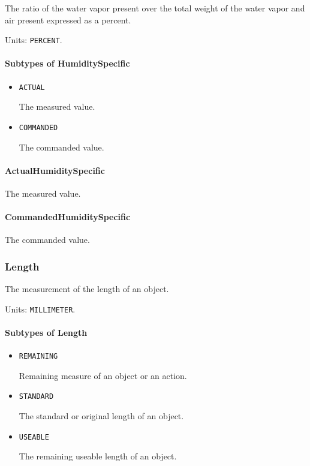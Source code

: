 The ratio of the water vapor present over the total weight of the water vapor and air present expressed as a percent.



Units: \texttt{PERCENT}.

\paragraph{Subtypes of HumiditySpecific}\mbox{}
\label{sec:Subtypes of HumiditySpecific}

\begin{itemize}

\item \texttt{ACTUAL}


The measured value.

\item \texttt{COMMANDED}


The commanded value.


\end{itemize}

\paragraph{ActualHumiditySpecific}\mbox{}
\label{sec:ActualHumiditySpecific}


The measured value.


\paragraph{CommandedHumiditySpecific}\mbox{}
\label{sec:CommandedHumiditySpecific}


The commanded value.


\subsubsection{Length}
\label{sec:Length}



The measurement of the length of an object.


Units: \texttt{MILLIMETER}.

\paragraph{Subtypes of Length}\mbox{}
\label{sec:Subtypes of Length}

\begin{itemize}

\item \texttt{REMAINING}


Remaining measure of an object or an action.

\item \texttt{STANDARD}


The standard or original length of an object.

\item \texttt{USEABLE}


The remaining useable length of an object.


\end{itemize}

